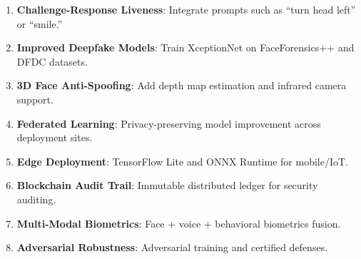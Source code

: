 \documentclass[conference,10pt]{IEEEtran}
\begin{document}
\begin{enumerate}
    \item \textbf{Challenge-Response Liveness}: Integrate prompts such as ``turn head left'' or ``smile.''
    \item \textbf{Improved Deepfake Models}: Train XceptionNet on FaceForensics++ and DFDC datasets.
    \item \textbf{3D Face Anti-Spoofing}: Add depth map estimation and infrared camera support.
    \item \textbf{Federated Learning}: Privacy-preserving model improvement across deployment sites.
    \item \textbf{Edge Deployment}: TensorFlow Lite and ONNX Runtime for mobile/IoT.
    \item \textbf{Blockchain Audit Trail}: Immutable distributed ledger for security auditing.
    \item \textbf{Multi-Modal Biometrics}: Face + voice + behavioral biometrics fusion.
    \item \textbf{Adversarial Robustness}: Adversarial training and certified defenses.
\end{enumerate}

\end{document}
